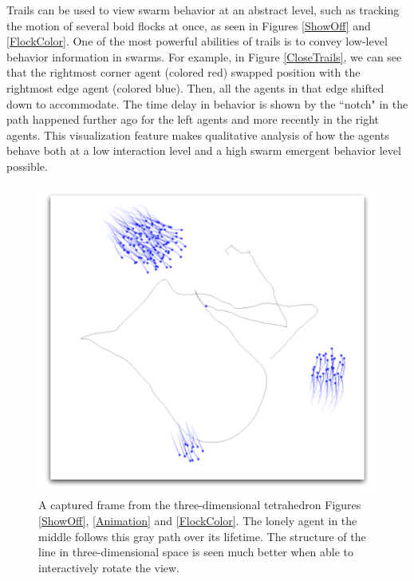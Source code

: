 \documentclass[conference]{IEEEtran}
\begin{document}
Trails can be used to view swarm behavior at an abstract level, such as tracking the motion of several boid
flocks at once, as seen in Figures \ref{ShowOff} and \ref{FlockColor}.
One of the most powerful abilities of trails is to convey low-level behavior information in swarms. For example,
in Figure \ref{CloseTrails}, we can see that the rightmost corner agent (colored red) swapped position with the rightmost
edge agent (colored blue). Then, all the agents in that edge shifted down to accommodate.
The time delay in behavior is shown by the ``notch" in the path happened further ago for the left agents and more recently
in the right agents.
This visualization feature makes qualitative analysis of how the agents behave both at a low interaction level
and a high swarm emergent behavior level possible.







\begin{figure}
\centering
\includegraphics[scale=.451]{images/track.pdf}
\caption{
A captured frame from the three-dimensional tetrahedron Figures \ref{ShowOff}, \ref{Animation} and \ref{FlockColor}.
The lonely agent in the middle follows this gray path over its lifetime. The structure of the line in three-dimensional space
is seen much better when able to interactively rotate the view.}
\label{Track}
\end{figure}
\end{document}
